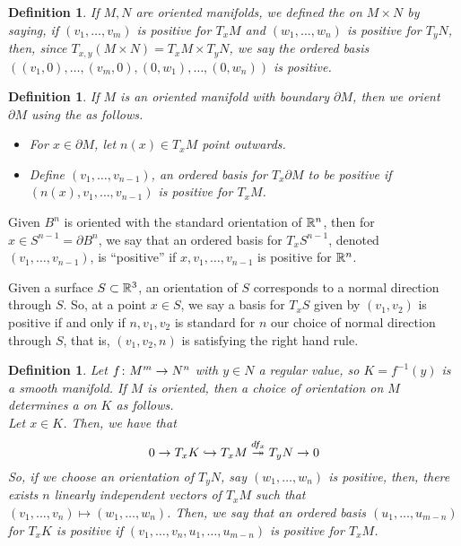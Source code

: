 \documentclass[11pt]{amsbook}
\theoremstyle{mystyle} %
\newtheorem{defi}[thm]{Definition}
\numberwithin{thm}{section}
\renewcommand{\d}{\partial}
\begin{document}
\begin{defi}
  If \(M,N\) are oriented manifolds, we defined the  on \(M \times N\) by saying, if \((v_1, \ldots,
  v_m)\) is positive for \(T_x M\) and \((w_1, \ldots, w_n)\) is
  positive for \(T_y N\), then, since \(T_{x,y}(M \times N) = T_x M
  \times T_y N\), we say the ordered basis \(((v_1, 0), \ldots, (v_m,
  0), (0,w_1), \ldots, (0,w_n))\) is positive.
\end{defi}
\begin{defi}
  If \(M\) is an oriented manifold with boundary \(\d M\), then we
  orient \(\d M\) using the  as follows.
  \begin{itemize}
  \item For \(x \in \d M\), let \(n(x) \in T_x M\) point outwards.
  \item Define \((v_1, \ldots, v_{n-1})\), an ordered basis for \(T_x
    \d M\) to be positive if \((n(x), v_1, \ldots, v_{n-1})\) is
    positive for \(T_x M\).
  \end{itemize}
\end{defi}
\begin{example}
  Given \(B^n\) is oriented with the standard orientation of \({\mathbb R}^n\),
  then for \(x \in S^{n-1} = \d B^n\), we say that an ordered basis
  for \(T_x S^{n-1}\), denoted \((v_1, \ldots, v_{n-1})\), is
  ``positive'' if \(x, v_1, \ldots, v_{n-1}\) is positive for \({\mathbb R}^n\).
\end{example}
\begin{example}
  Given a surface \(S \subset {\mathbb R}^3\), an orientation of \(S\)
  corresponds to a normal direction through \(S\). So, at a point
  \(x \in S\), we say a basis for \(T_x S\) given by \((v_1, v_2)\)
  is positive if and only if \(n, v_1, v_2\) is standard for \(n\) our
  choice of normal direction through \(S\), that is,
  \((v_1,v_2,n)\) is satisfying the right hand rule.
\end{example}
\begin{defi}
  Let \(f \colon M^m \to N^n\) with \(y \in N\) a regular value, so \(K
  = f^{-1}(y)\) is a smooth manifold. If \(M\) is oriented, then a
  choice of orientation on \(M\) determines a  on \(K\) as
  follows. \\

  Let \(x \in K\). Then, we have that \[
    0 \to T_x K \hookrightarrow T_x M \overset{df_x}{\twoheadrightarrow} T_y N \to 0
  \]
  So, if we choose an orientation of \(T_y N\), say \((w_1, \ldots,
  w_n)\) is positive, then, there exists \(n\) linearly independent vectors of \(T_x M\)
  such that \((v_1, \ldots, v_n) \mapsto (w_1, \ldots, w_n)\). Then,
  we say that an ordered basis \((u_1, \ldots, u_{m-n})\) for \(T_x
  K\) is positive if \((v_1, \ldots, v_n, u_1, \ldots, u_{m-n})\) is
  positive for \(T_x M\).
\end{defi}
\end{document}

